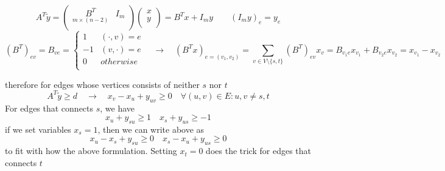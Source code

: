 \documentclass[11pt]{article}
\begin{document}
\[
    A^T \tilde{y} = 
    \begin{pmatrix}
        \underset{m\times (n-2)}{B^T} & I_m \\ 
    \end{pmatrix}    
    \begin{pmatrix}
        x \\ y \\ 
    \end{pmatrix}
    = 
    B^T x  + I_m y 
    \qquad 
    (I_m y)_{e} = y_e
\]
\[
    (B^T)_{ev} = B_{ve} = 
    \begin{cases}
        1 & (\cdot , v) = e \\
        -1 & (v, \cdot ) = e \\ 
        0 & otherwise \\
    \end{cases}   
    \quad 
    \rightarrow 
    \quad 
    (B^T x)_{e=(v_1,v_2)} = \sum_{v\in V\setminus \{s,t\}} (B^T)_{ev} x_v = B_{v_1 e} x_{v_1} + B_{v_2 e} x_{v_2} = x_{v_1} - x_{v_2}
\]


therefore for edges whose vertices consists of neither $s$ nor $t$
\[
    A^T \tilde{y} \geq d 
    \quad \rightarrow \quad 
    x_v - x_u + y_{uv} \geq 0 \quad \forall (u,v)\in E: u,v\neq s,t
\]
For edges that connects $s$, we have 
\[
    x_u + y_{su} \geq 1 
    \quad 
    x_s + y_{us} \geq -1
\]
if we set variables $x_s=1$, then we can write above as 
\[
    x_u - x_s + y_{su} \geq 0 
    \quad 
    x_s - x_u + y_{us} \geq 0   
\]
to fit with how the above formulation. Setting $x_t=0$ does the trick for edges that connects $t$
\end{document}
